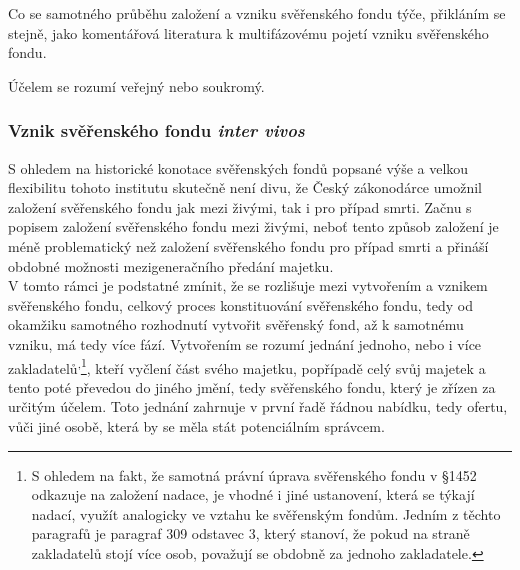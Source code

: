 \documentclass{article}
\begin{document}
Co se samotného průběhu založení a vzniku svěřenského fondu týče, přikláním se stejně, jako komentářová literatura k multifázovému pojetí vzniku svěřenského fondu.


Účelem se rozumí veřejný nebo soukromý.

\subsubsection{Vznik svěřenského fondu \textit{inter vivos}}

S ohledem na historické konotace svěřenských fondů popsané výše a velkou flexibilitu tohoto institutu skutečně není divu, že Český zákonodárce umožnil založení svěřenského fondu jak mezi živými, tak i pro případ smrti. Začnu s popisem založení svěřenského fondu mezi živými, neboť tento způsob založení je méně problematický než založení svěřenského fondu pro případ smrti a přináší obdobné možnosti mezigeneračního předání majetku.\\

V tomto rámci je podstatné zmínit, že se rozlišuje mezi vytvořením a vznikem svěřenského fondu, celkový proces konstituování svěřenského fondu, tedy od okamžiku samotného rozhodnutí vytvořit svěřenský fond, až k samotnému vzniku, má tedy více fází. Vytvořením se rozumí jednání jednoho, nebo i více zakladatelů\textsuperscript{,}\footnote{S ohledem na fakt, že samotná právní úprava svěřenského fondu v §1452 odkazuje na založení nadace, je vhodné i jiné ustanovení, která se týkají nadací, využít analogicky ve vztahu ke svěřenským fondům. Jedním z těchto paragrafů je paragraf  309 odstavec 3, který stanoví, že pokud na straně zakladatelů stojí více osob, považují se obdobně za jednoho zakladatele.}, kteří vyčlení část svého majetku, popřípadě celý svůj majetek a tento poté převedou do jiného jmění, tedy svěřenského fondu, který je zřízen za určitým účelem. Toto jednání zahrnuje v první řadě řádnou nabídku, tedy ofertu, vůči jiné osobě, která by se měla stát potenciálním správcem.\\
\end{document}
